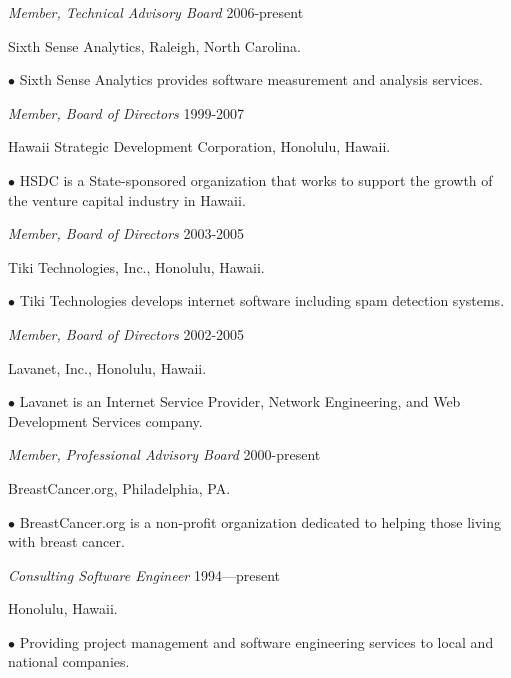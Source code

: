 \begin{Industry Experience}

\item {\em Member, Technical Advisory Board} \hfill 2006-present
\vspace*{-10pt}
\item Sixth Sense Analytics, Raleigh, North Carolina.

  $\bullet$ Sixth Sense Analytics provides software measurement
and analysis services. 

\item {\em Member, Board of Directors} \hfill 1999-2007
\vspace*{-10pt}
\item Hawaii Strategic Development Corporation, Honolulu, Hawaii.

  $\bullet$ HSDC is a State-sponsored organization that works
to support the growth of the venture capital industry in Hawaii.

\item {\em Member, Board of Directors} \hfill 2003-2005
\vspace*{-10pt}
\item Tiki Technologies, Inc., Honolulu, Hawaii.

  $\bullet$ Tiki Technologies develops internet software including
spam detection systems. 

\item {\em Member, Board of Directors} \hfill 2002-2005
\vspace*{-10pt}
\item Lavanet, Inc., Honolulu, Hawaii.

  $\bullet$ Lavanet is an Internet Service Provider, 
Network Engineering, and Web Development Services company.



\item {\em Member, Professional Advisory Board} \hfill 2000-present
\vspace*{-10pt}
\item BreastCancer.org, Philadelphia, PA.

  $\bullet$ BreastCancer.org is a non-profit organization dedicated 
  to helping those living with breast cancer. 

\item {\em Consulting Software Engineer} \hfill 1994---present
\vspace*{-10pt}
\item Honolulu, Hawaii.

  $\bullet$ Providing project management and software engineering services to local and national companies.

\end{Industry Experience}


